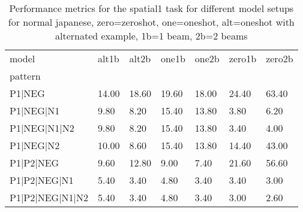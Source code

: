 \begin{table}[h]
\begin{tabular}{l|llllll}
\toprule
model & alt1b & alt2b & one1b & one2b & zero1b & zero2b \\
pattern &  &  &  &  &  &  \\
\midrule
P1|NEG & 14.00 & 18.60 & 19.60 & 18.00 & 24.40 & 63.40 \\
P1|NEG|N1 & 9.80 & 8.20 & 15.40 & 13.80 & 3.80 & 6.20 \\
P1|NEG|N1|N2 & 9.80 & 8.20 & 15.40 & 13.80 & 3.40 & 4.00 \\
P1|NEG|N2 & 10.00 & 8.60 & 15.40 & 13.80 & 14.40 & 43.00 \\
P1|P2|NEG & 9.60 & 12.80 & 9.00 & 7.40 & 21.60 & 56.60 \\
P1|P2|NEG|N1 & 5.40 & 3.40 & 4.80 & 3.40 & 3.40 & 3.00 \\
P1|P2|NEG|N1|N2 & 5.40 & 3.40 & 4.80 & 3.40 & 3.00 & 2.60 \\
\bottomrule
\end{tabular}
\caption{Performance metrics for the spatial1 task for different model setups for normal japanese, zero=zeroshot, one=oneshot, alt=oneshot with alternated example, 1b=1 beam, 2b=2 beams}
\label{tab:ja norm_spatial1_performance}
\end{table}
